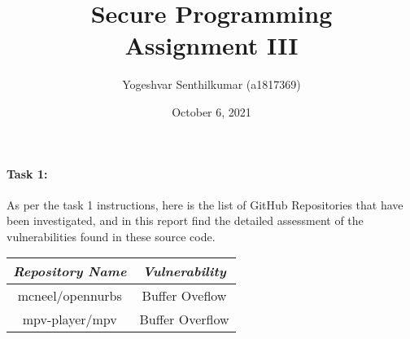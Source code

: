 \documentclass[14pt,a4paper]{report}
\begin{document}
\title{Secure Programming \protect\\ Assignment III} 

\author{Yogeshvar Senthilkumar (a1817369)}        
\date{October 6, 2021}    
\maketitle

\newpage

\paragraph{Task 1:}
As per the task 1 instructions, here is the list of GitHub Repositories that have been investigated, and in this report find the detailed assessment of the vulnerabilities found in these source code.

\begin{center}
\vspace{5pt}
\begin{tabular}{|c|c|}
    \hline
    \textit{Repository Name} & \textit{Vulnerability} \\ 
    \hline
     mcneel/opennurbs & Buffer Oveflow \\
     \hline
     mpv-player/mpv & Buffer Overflow \\
      \hline
\end{tabular}
\end{center}
\end{document}
